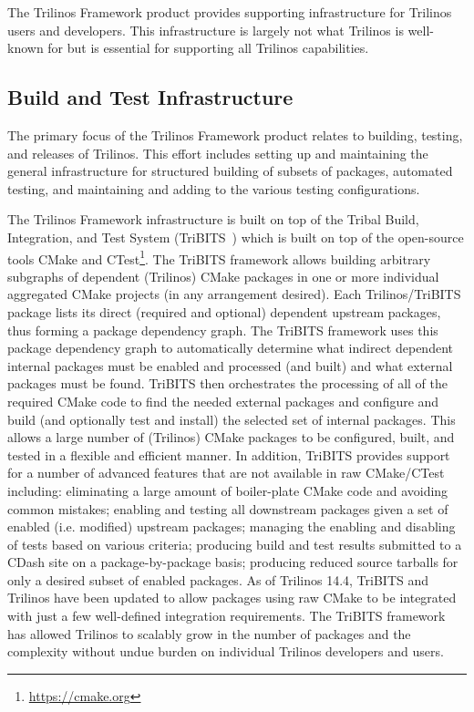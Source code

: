 
The Trilinos Framework product provides supporting infrastructure for Trilinos users and developers. This infrastructure is largely not what Trilinos is well-known for but is essential for supporting all Trilinos capabilities.

\subsection{Build and Test Infrastructure}

The primary focus of the Trilinos Framework product relates to building, testing, and releases of Trilinos. This effort includes setting up and maintaining the general infrastructure for structured building of subsets of packages, automated testing, and maintaining and adding to the various testing configurations.

The Trilinos Framework infrastructure is built on top of the Tribal Build, Integration, and Test System (TriBITS~\cite{Bartlett2014}) which is built on top of the open-source tools CMake and CTest\footnote{\url{https://cmake.org}}.
The TriBITS framework allows building arbitrary subgraphs of dependent (Trilinos) CMake packages in one or more individual aggregated CMake projects (in any arrangement desired).
Each Trilinos/TriBITS package lists its direct (required and optional) dependent upstream packages, thus forming a package dependency graph.
The TriBITS framework uses this package dependency graph to automatically determine what indirect dependent internal packages must be enabled and processed (and built) and what external packages must be found.
TriBITS then orchestrates the processing of all of the required CMake code to find the needed external packages and configure and build (and optionally test and install) the selected set of internal packages.
This allows a large number of (Trilinos) CMake packages to be configured, built, and tested in a flexible and efficient manner.
In addition, TriBITS provides support for a number of advanced features that are not available in raw CMake/CTest including: eliminating a large amount of boiler-plate CMake code and avoiding common mistakes; enabling and testing all downstream packages given a set of enabled (i.e. modified) upstream packages; managing the enabling and disabling of tests based on various criteria; producing build and test results submitted to a CDash site on a package-by-package basis; producing reduced source tarballs for only a desired subset of enabled packages.
As of Trilinos 14.4, TriBITS and Trilinos have been updated to allow packages using raw CMake to be integrated with just a few well-defined integration requirements.
The TriBITS framework has allowed Trilinos to scalably grow in the number of packages and the complexity without undue burden on individual Trilinos developers and users.

